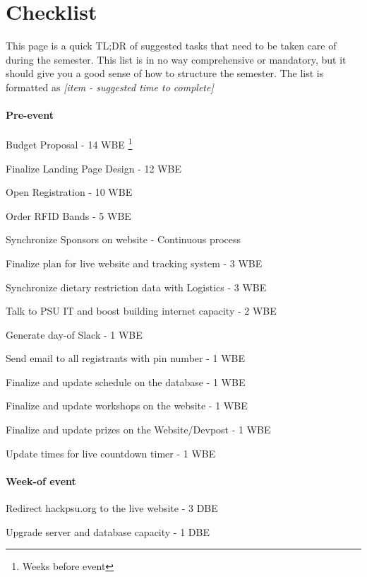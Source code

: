 \documentclass[twoside, 12pt]{article}
\begin{document}
\section{Checklist}
\par This page is a quick TL;DR of suggested tasks that need to be taken care of during the semester. This list is in no way comprehensive or mandatory, but it should give you a good sense of how to structure the semester. The list is formatted as \textit{[item - suggested time to complete]}
\paragraph{Pre-event}
\begin{checklist}
    \setlength\itemsep{1pt}
    \item Budget Proposal - 14 WBE \footnote{Weeks before event}
    \item Finalize Landing Page Design - 12 WBE
    \item Open Registration - 10 WBE
    \item Order RFID Bands - 5 WBE
    \item Synchronize Sponsors on website - Continuous process
    \item Finalize plan for live website and tracking system - 3 WBE
    \item Synchronize dietary restriction data with Logistics - 3 WBE
    \item Talk to PSU IT and boost building internet capacity - 2 WBE
    \item Generate day-of Slack - 1 WBE
    \item Send email to all registrants with pin number - 1 WBE
    \item Finalize and update schedule on the database - 1 WBE
    \item Finalize and update workshops on the website - 1 WBE
    \item Finalize and update prizes on the Website/Devpost - 1 WBE
    \item Update times for live countdown timer - 1 WBE
\end{checklist}
\paragraph{Week-of event}
\begin{checklist}
    \setlength\itemsep{1pt}
    \item Redirect hackpsu.org to the live website - 3 DBE
    \item Upgrade server and database capacity - 1 DBE
\end{checklist}
\end{document}
